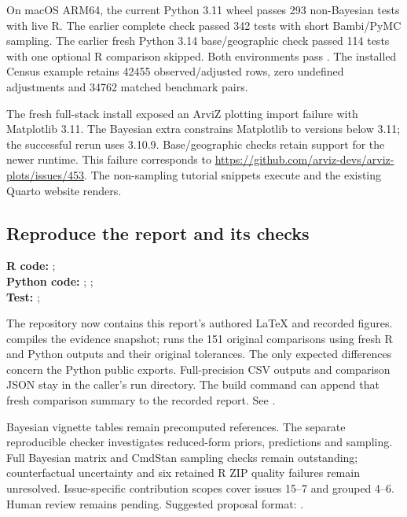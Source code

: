 \documentclass[10pt]{article}
\begin{document}
On macOS ARM64, the current Python 3.11 wheel passes 293 non-Bayesian tests with
live R. The earlier complete check passed 342 tests with short Bambi/PyMC sampling. The earlier fresh Python 3.14 base/geographic
check passed 114 tests with one optional R comparison skipped. Both environments
pass . The installed Census example retains 42455 observed/adjusted
rows, zero undefined adjustments and 34762 matched benchmark pairs.

The fresh full-stack install exposed an ArviZ plotting import failure with Matplotlib 3.11.
The Bayesian extra constrains Matplotlib to versions below 3.11; the successful rerun uses
3.10.9. Base/geographic checks retain support for the newer runtime. This failure corresponds
to \url{https://github.com/arviz-devs/arviz-plots/issues/453}.
The non-sampling tutorial snippets execute and the existing Quarto website renders.

\subsection{Reproduce the report and its checks}
{\footnotesize \textbf{R code:} ; \\
\textbf{Python code:} ; ; \\
\textbf{Test:} ; \par}

The repository now contains this report's authored LaTeX and recorded figures.
 compiles the evidence snapshot; 
runs the 151 original comparisons using fresh R and Python outputs and their original
tolerances. The only expected differences concern the Python public exports. Full-precision
CSV outputs and comparison JSON stay in the caller's run directory. The build command can
append that fresh comparison summary to the recorded report. See .

Bayesian vignette tables remain precomputed references. The separate reproducible
checker investigates reduced-form priors, predictions and sampling. Full Bayesian
matrix and CmdStan sampling checks remain outstanding; counterfactual uncertainty
and six retained R ZIP quality failures remain unresolved. Issue-specific
contribution scopes cover issues 15--7 and grouped 4--6. Human review remains
pending. Suggested proposal format: .
\end{document}
